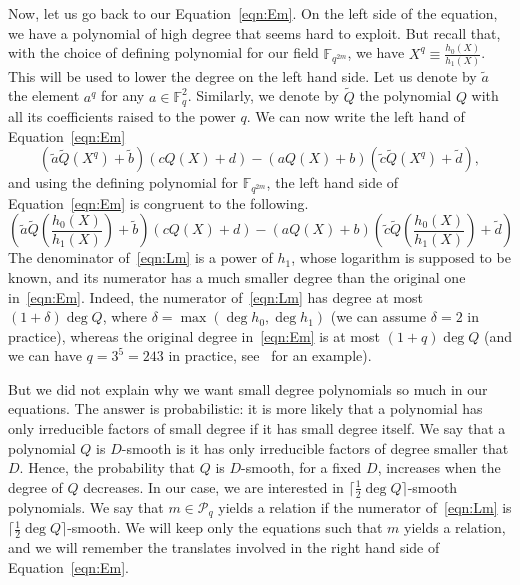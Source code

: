 \documentclass[a4paper,11pt]{article}
\theoremstyle{break}
\theoremstyle{sc}
\theoremstyle{definition}
\theoremstyle{remark}
\begin{document}
Now, let us go back to our Equation~\eqref{eqn:Em}. On the left side of the equation, we have a polynomial of high degree that seems
hard to exploit. But recall that, with the choice of defining polynomial for our
field $\mathbb{F}_{q^{2m}}$, we have $X^q \equiv \frac{h_0(X)}{h_1(X)}$. This will
be used to lower the degree on the left hand side. Let us denote by $\tilde a$
the element $a^q$ for any $a\in\mathbb{F}_q^2$. Similarly, we denote by
$\widetilde Q$ the polynomial $Q$ with all its coefficients raised to the power
$q$. We can now write the left hand of Equation~\eqref{eqn:Em}
\[
  (\tilde a \widetilde Q (X^q)+\tilde b)(cQ(X)+d)-(aQ(X)+b)(\tilde c\widetilde
  Q(X^q)+\tilde d),
\]
and using the defining polynomial for $\mathbb{F}_{q^{2m}}$, the left hand side of
Equation~\eqref{eqn:Em} is congruent to the following.
\begin{equation}
  \tag{$\mathcal L_m$}
  \left(\tilde a \widetilde Q \left(\frac{h_0(X)}{h_1(X)}\right)+\tilde
  b\right)(cQ(X)+d)-(aQ(X)+b)\left(\tilde c\widetilde
  Q\left(\frac{h_0(X)}{h_1(X)}\right)+\tilde d\right)
  \label{eqn:Lm}
\end{equation}
The denominator of~\eqref{eqn:Lm} is a power of $h_1$, whose logarithm is supposed
to be known, and its numerator has a much smaller degree than the original one
in~\eqref{eqn:Em}. Indeed, the numerator of~\eqref{eqn:Lm} has degree at most
$(1+\delta)\deg Q$, where $\delta=\max(\deg h_0, \deg h_1)$ (we can assume
$\delta=2$ in practice), whereas the original degree in~\eqref{eqn:Em} is at
most $(1+q)\deg Q$ (and we can have $q = 3^5 = 243$ in practice,
see~\cite{Adj16} for an example).

But we did not explain why we want small degree polynomials so much in our
equations. The answer is probabilistic: it is more likely that a polynomial
has only irreducible factors of small degree if it has small degree itself. We
say that a polynomial $Q$ is $D$-smooth is it has only irreducible factors of
degree smaller that $D$. Hence, the probability that $Q$ is $D$-smooth, for a
fixed $D$, increases when the degree of $Q$ decreases. In our case, we are
interested in $\lceil\frac{1}{2}\deg Q\rceil$-smooth polynomials. We say that
$m\in\mathcal P_q$ yields a relation if the numerator of~\eqref{eqn:Lm} is
$\lceil\frac{1}{2}\deg Q\rceil$-smooth. We will keep only the equations such
that $m$ yields a relation, and we will remember the translates involved in
the right hand side of Equation~\eqref{eqn:Em}.
\end{document}
